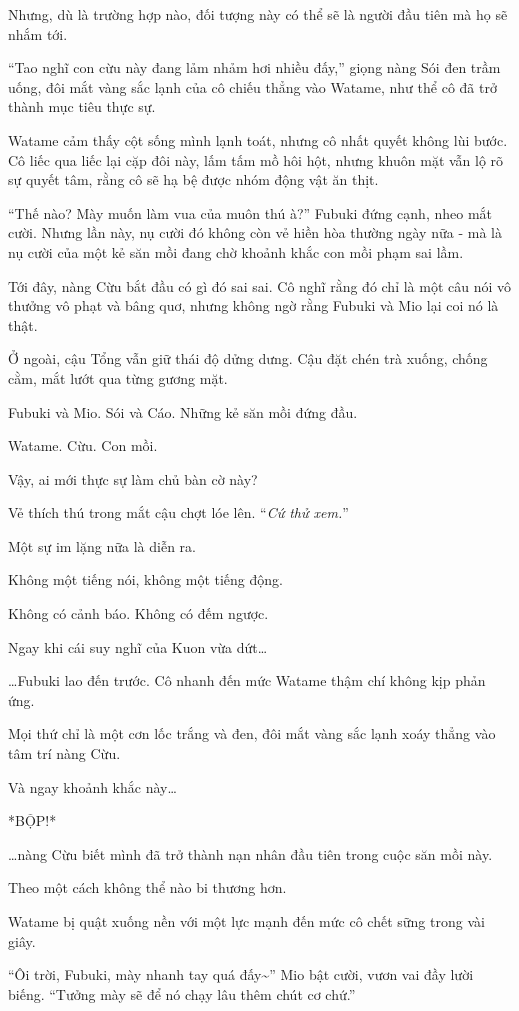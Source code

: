 \documentclass[../main.tex]{subfiles}
\begin{document}
Nhưng, dù là trường hợp nào, đối tượng này có thể sẽ là người đầu tiên mà họ sẽ nhắm tới.

``Tao nghĩ con cừu này đang lảm nhảm hơi nhiều đấy,'' giọng nàng Sói đen trầm uống, đôi mắt vàng sắc lạnh của cô chiếu thẳng vào Watame, như thể cô đã trở thành mục tiêu thực sự.

Watame cảm thấy cột sống mình lạnh toát, nhưng cô nhất quyết không lùi bước. Cô liếc qua liếc lại cặp đôi này, lấm tấm mồ hôi hột, nhưng khuôn mặt vẫn lộ rõ sự quyết tâm, rằng cô sẽ hạ bệ được nhóm động vật ăn thịt.

``Thế nào? Mày muốn làm vua của muôn thú à?'' Fubuki đứng cạnh, nheo mắt cười. Nhưng lần này, nụ cười đó không còn vẻ hiền hòa thường ngày nữa - mà là nụ cười của một kẻ săn mồi đang chờ khoảnh khắc con mồi phạm sai lầm.

Tới đây, nàng Cừu bắt đầu có gì đó sai sai. Cô nghĩ rằng đó chỉ là một câu nói vô thưởng vô phạt và bâng quơ, nhưng không ngờ rằng Fubuki và Mio lại coi nó là thật.

Ở ngoài, cậu Tổng vẫn giữ thái độ dửng dưng. Cậu đặt chén trà xuống, chống cằm, mắt lướt qua từng gương mặt.

Fubuki và Mio. Sói và Cáo. Những kẻ săn mồi đứng đầu.

Watame. Cừu. Con mồi.

Vậy, ai mới thực sự làm chủ bàn cờ này?

Vẻ thích thú trong mắt cậu chợt lóe lên. ``\textit{Cứ thử xem.}''

Một sự im lặng nữa là diễn ra.

Không một tiếng nói, không một tiếng động.

Không có cảnh báo. Không có đếm ngược.

Ngay khi cái suy nghĩ của Kuon vừa dứt\dots

\dots Fubuki lao đến trước. Cô nhanh đến mức Watame thậm chí không kịp phản ứng.

Mọi thứ chỉ là một cơn lốc trắng và đen, đôi mắt vàng sắc lạnh xoáy thẳng vào tâm trí nàng Cừu.

Và ngay khoảnh khắc này\dots

*BỘP!*

\dots nàng Cừu biết mình đã trở thành nạn nhân đầu tiên trong cuộc săn mồi này.

Theo một cách không thể nào bi thương hơn.

Watame bị quật xuống nền với một lực mạnh đến mức cô chết sững trong vài giây.

``Ôi trời, Fubuki, mày nhanh tay quá đấy\~{}'' Mio bật cười, vươn vai đầy lười biếng. ``Tưởng mày sẽ để nó chạy lâu thêm chút cơ chứ.''
\end{document}
